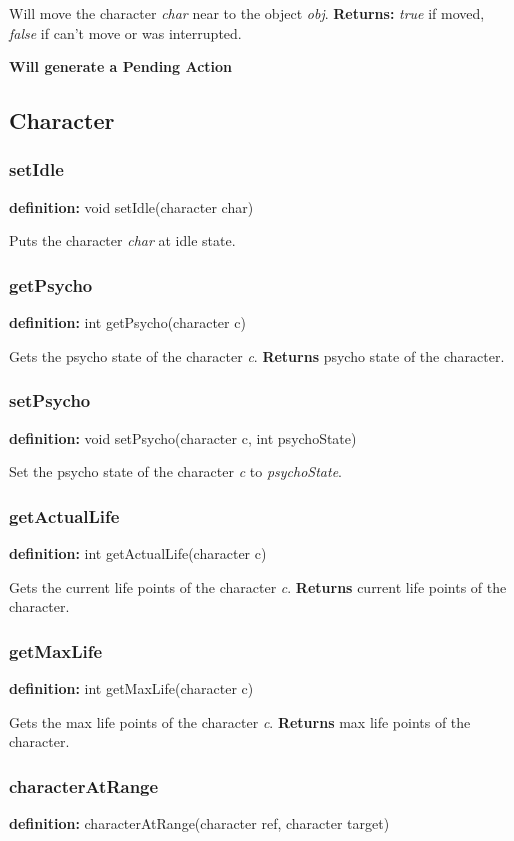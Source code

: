 \documentclass[ letterpaper,12pt]{article}
\begin{document}
Will move the character {\it char} near to the object {\it obj}. {\bf Returns:} 
{\it true} if moved, {\it false} if can't move or was interrupted.

{\bf Will generate a Pending Action}

\subsection{Character}

\subsubsection{setIdle}
{\bf definition:} void setIdle(character char)

Puts the character {\it char} at idle state.

\subsubsection{getPsycho}
{\bf definition:} int getPsycho(character c)

Gets the psycho state of the character {\it c}. {\bf Returns} psycho state of
the character.

\subsubsection{setPsycho}
{\bf definition:} void setPsycho(character c, int psychoState)

Set the psycho state of the character {\it c} to {\it psychoState}.

\subsubsection{getActualLife}
{\bf definition:} int getActualLife(character c)

Gets the current life points of the character {\it c}. {\bf Returns} current
life points of the character.

\subsubsection{getMaxLife}
{\bf definition:} int getMaxLife(character c)

Gets the max life points of the character {\it c}. {\bf Returns} max
life points of the character.

\subsubsection{characterAtRange}
{\bf definition:} characterAtRange(character ref, character target)
\end{document}
